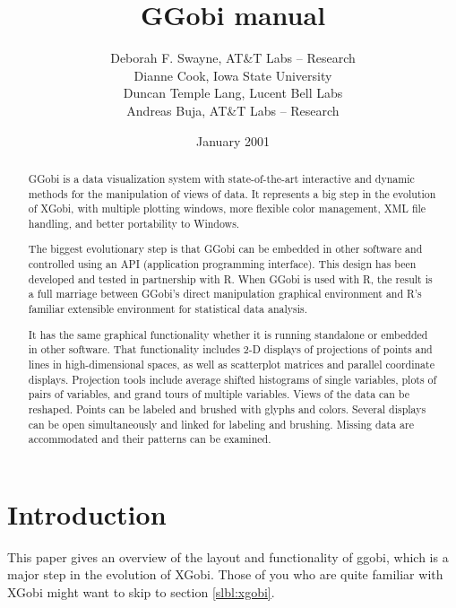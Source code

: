 \documentclass[11pt]{article}
\begin{document}
\title {GGobi manual}
\author{
Deborah F. Swayne, AT\&T Labs -- Research \\
Dianne Cook, Iowa State University \\
Duncan Temple Lang, Lucent Bell Labs \\
Andreas Buja, AT\&T Labs -- Research
}
\date{January 2001}

\maketitle


\begin{abstract}

GGobi is a data visualization system with state-of-the-art
interactive and dynamic methods for the manipulation of views of
data.  It represents a big step in the evolution of XGobi, with
multiple plotting windows, more flexible color management, XML file
handling, and better portability to Windows.

The biggest evolutionary step is that GGobi can be embedded in other
software and controlled using an API (application programming
interface).  This design has been developed and tested in partnership
with R.  When GGobi is used with R, the result is a full marriage
between GGobi's direct manipulation graphical environment and R's
familiar extensible environment for statistical data analysis.

It has the same graphical functionality whether it is running
standalone or embedded in other software.  That functionality
includes 2-D displays of projections of points and lines in
high-dimensional spaces, as well as scatterplot matrices and parallel
coordinate displays.  Projection tools include average shifted
histograms of single variables, plots of pairs of variables, and
grand tours of multiple variables.  Views of the data can be
reshaped.  Points can be labeled and brushed with glyphs and colors.
Several displays can be open simultaneously and linked for labeling
and brushing.  Missing data are accommodated and their patterns can
be examined.
\end{abstract}

\section{Introduction}

This paper gives an overview of the layout and functionality of ggobi,
which is a major step in the evolution of XGobi.  Those of you who are
quite familiar with XGobi might want to skip to section
\ref{slbl:xgobi}.
\end{document}

